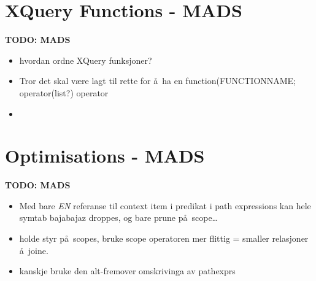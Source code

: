 \section{XQuery Functions - {MADS}}
\label{sect:disc:functions}
\textbf{\LARGE TODO: {MADS}}
\begin{itemize}
  \item hvordan ordne XQuery funksjoner?
  \item Tror det skal v\ae re lagt til rette for \aa~ha en \textsf{function(FUNCTIONNAME; operator(list?)} operator
  \item 
\end{itemize}

\section{Optimisations - {MADS}}
\label{sect:disc:optimisations}
\textbf{\LARGE TODO: {MADS}}
\begin{itemize}
  \item Med bare \emph{EN} referanse til context item i predikat i path expressions kan hele symtab bajabajaz
  droppes, og bare prune p\aa~scope\ldots
  \item holde styr p\aa~scopes, bruke scope operatoren mer flittig = smaller relasjoner \aa~joine.
  \item kanskje bruke den alt-fremover omskrivinga av pathexprs
\end{itemize}